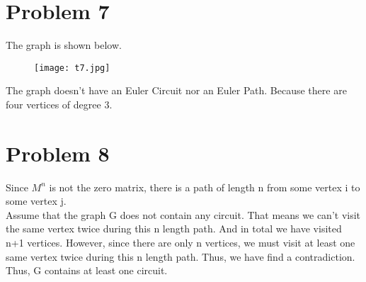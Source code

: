 \documentclass{article}
\begin{document}
\section{Problem 7}
The graph is shown below.\\
\begin{figure}[H]
\centering
\texttt{[image: t7.jpg]}
\end{figure}
The graph doesn't have an Euler Circuit nor an Euler Path. Because there are four vertices of degree 3.\\
\section{Problem 8}
Since $M^n$ is not the zero matrix, there is a path of length n from some vertex i to some vertex j.\\
Assume that the graph G does not contain any circuit. That means we can't visit the same vertex twice during this n length path. And in total we have visited n+1 vertices.
However, since there are only n vertices, we must visit at least one same vertex twice during this n length path. Thus, we have find a contradiction.\\
Thus, G contains at least one circuit.\\
\end{document}
